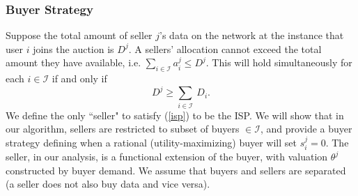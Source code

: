 \documentclass[12pt]{article}
\theoremstyle{definition}
\newcommand{\mcI}{\mathcal{I}}
\begin{document}
\begin{multicols}{2}
\subsubsection{Buyer Strategy}

Suppose the total amount of seller $j$'s data on the network at the instance that
user $i$ joins the auction is $D^j$. 
A sellers' allocation cannot exceed the total amount they have available,
i.e. $\sum_{i\in\mcI} a_i^j \le D^j$. This will hold simultaneously for each $i \in
\mcI$ if and only if 
\begin{equation}\label{isp}
    D^j \ge \sum_{i\in\mcI} \ D_i.
\end{equation}
We define the only ``seller" to satisfy (\ref{isp}) to be the ISP.
We will show that in our
algorithm, sellers are restricted to subset of buyers $\in\mcI$, and provide a
buyer strategy defining when a rational (utility-maximizing) buyer will set $s_i^j = 0$. The seller, in our analysis, is a functional
extension of the buyer, with valuation $\theta^j$ constructed by buyer demand.
We assume that buyers and sellers are separated (a seller does not also buy
data and vice versa).


\end{multicols}
\end{document}
